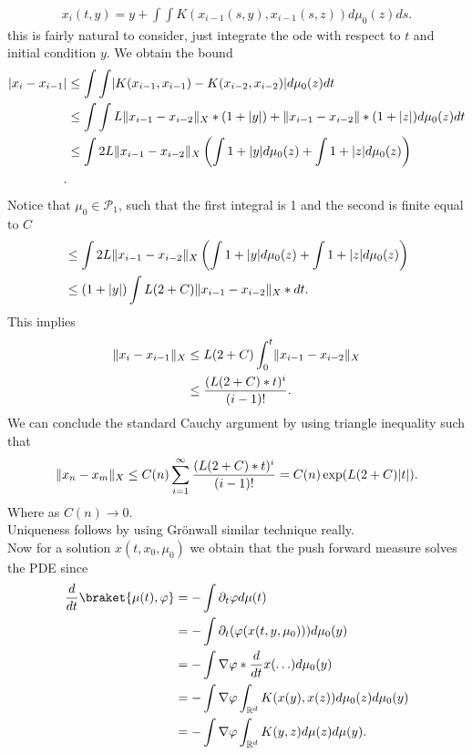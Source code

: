 \begin{align*}
  x_i(t,y) = y + \int \int K(x_{i-1}(s,y),x_{i-1}(s,z)) d\mu_0(z) ds 
.\end{align*}
this is fairly natural to consider, just integrate the ode with respect to $t$ and initial condition $y$. We obtain the bound 
\begin{align*}
  \lvert x_i - x_{i-1}\rvert &\le \int \int \lvert K(x_{i-1},x_{i-1})-K(x_{i-2},x_{i-2})\rvert d\mu_0(z) dt\\
                      &\le \int \int L \lVert x_{i-1}-x_{i-2}\rVert_{X}*(1+\lvert y\rvert) + \lVert x_{i-1}-x_{i-2}\rVert*(1+\lvert z\rvert)  d\mu_0(z) dt\\
                      &\le \int 2L\lVert x_{i-1}-x_{i-2}\rVert_{X} \left(  \int 1+\lvert y\rvert d\mu_0(z) +   \int 1+\lvert z\rvert d\mu_{0}(z) \right) \\
.\end{align*}
Notice that $\mu_0 \in  \mathcal{P}_1$, such that the first integral is 1 and the second is finite equal to $C$
\begin{align*}
  &\le \int 2L\lVert x_{i-1}-x_{i-2}\rVert_{X} \left(  \int 1+\lvert y\rvert d\mu_0(z) +   \int 1+\lvert z\rvert d\mu_{0}(z) \right) \\
  &\le (1+\lvert y\rvert)\int  L(2+C)\lVert x_{i-1}-x_{i-2}\rVert_{X}* dt
.\end{align*}
This implies 
\begin{align*}
  \lVert x_i-x_{i-1}\rVert_X &\le L(2+C) \int_0^{t}  \lVert x_{i-1}-x_{i-2}\rVert_{X}\\
                       &\le \frac{(L(2+C)*t)^{i} }{(i-1)!}
.\end{align*}
We can conclude the standard Cauchy argument by using triangle inequality such that 
\begin{align*}
  \|x_n - x_m\|_X \le C(n)\sum_{i=1}^{\infty} \frac{(L(2+C)*t)^{i} }{(i-1)!} = C(n)\exp(L(2+C)\lvert t\rvert)
.\end{align*}
Where as $C(n) \to 0$.\\
Uniqueness follows by using Grönwall similar technique really.\\[1ex]
Now for a solution $x(t,x_{0},\mu_0)$ we obtain that the push forward measure solves the PDE since 
\begin{align*}
  \frac{d}{dt} \braket{\mu(t),\phi } &= - \int \partial_t \phi  d\mu(t)\\
                                     &= - \int \partial_t (\phi(x(t,y,\mu_0))) d\mu_0(y)\\
                                     &= - \int \nabla \phi * \frac{d}{dt} x(\ldots ) d\mu_0(y) \\
                                     &= - \int \nabla \phi \int_{\mathbb{R}^{d} } K(x(y),x(z)) d\mu_0(z) d\mu_0(y)\\
                                     &= - \int \nabla \phi \int_{\mathbb{R}^{d} } K(y,z) d\mu(z) d\mu(y)
.\end{align*}

